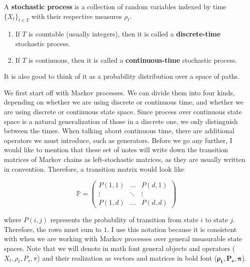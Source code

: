 \documentclass{article}
\begin{document}
  \begin{example}[Class 1] 
    
  \end{example}

  \begin{example}[Class 2]
    
  \end{example}

  \begin{definition}
    A \textbf{stochastic process} is a collection of random variables indexed by time $\{X_t\}_{t \in T}$ with their respective measures $\rho_t$. 

    \begin{enumerate}
      \item If $T$ is countable (usually integers), then it is called a \textbf{discrete-time} stochastic process. 
      \item If $T$ is continuous, then it is called a \textbf{continuous-time} stochastic process. 
    \end{enumerate}

    It is also good to think of it as a probability distribution over a space of paths. 
  \end{definition}

  We first start off with Markov processes. We can divide them into four kinds, depending on whether we are using discrete or continuous time, and whether we are using discrete or continuous state space. Since process over continuous state space is a natural generalization of those in a discrete one, we only distinguish between the times. When talking about continuous time, there are additional operators we must introduce, such as generators. Before we go any further, I would like to mention that these set of notes will write down the transition matrices of Markov chains as left-stochastic matrices, as they are usually written in convention. Therefore, a transition matrix would look like 

    \[\mathbb{P} = \begin{pmatrix} P(1, 1) & \ldots & P(d, 1) \\ \vdots & \ddots & \vdots \\ P(1, d) & \ldots & P(d, d) \end{pmatrix} \]

  where $P(i, j)$ represents the probability of transition from state $i$ to state $j$. Therefore, the rows must sum to $1$. I use this notation because it is consistent with when we are working with Markov processes over general measurable state spaces. Note that we will denote in math font general objects and operators ($X_t, \rho_t, P_s, \pi$) and their realization as vectors and matrices in bold font ($\boldsymbol{\rho_t}, \mathbf{P_s}, \boldsymbol{\pi}$). 
\end{document}
